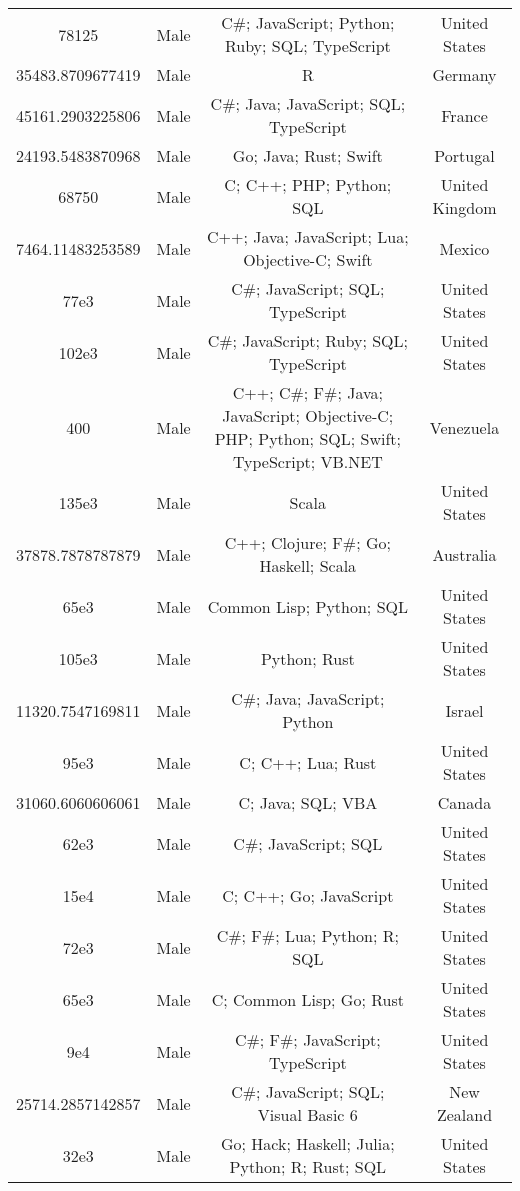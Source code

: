 \begin{center}
\begin{tabular}{ |c|c|c|c| }
78125  &  Male  &  C\#; JavaScript; Python; Ruby; SQL; TypeScript  &  United States  \\ 
35483.8709677419  &  Male  &  R  &  Germany  \\ 
45161.2903225806  &  Male  &  C\#; Java; JavaScript; SQL; TypeScript  &  France  \\ 
24193.5483870968  &  Male  &  Go; Java; Rust; Swift  &  Portugal  \\ 
68750  &  Male  &  C; C++; PHP; Python; SQL  &  United Kingdom  \\ 
7464.11483253589  &  Male  &  C++; Java; JavaScript; Lua; Objective-C; Swift  &  Mexico  \\ 
77e3  &  Male  &  C\#; JavaScript; SQL; TypeScript  &  United States  \\ 
102e3  &  Male  &  C\#; JavaScript; Ruby; SQL; TypeScript  &  United States  \\ 
400  &  Male  &  C++; C\#; F\#; Java; JavaScript; Objective-C; PHP; Python; SQL; Swift; TypeScript; VB.NET  &  Venezuela  \\ 
135e3  &  Male  &  Scala  &  United States  \\ 
37878.7878787879  &  Male  &  C++; Clojure; F\#; Go; Haskell; Scala  &  Australia  \\ 
65e3  &  Male  &  Common Lisp; Python; SQL  &  United States  \\ 
105e3  &  Male  &  Python; Rust  &  United States  \\ 
11320.7547169811  &  Male  &  C\#; Java; JavaScript; Python  &  Israel  \\ 
95e3  &  Male  &  C; C++; Lua; Rust  &  United States  \\ 
31060.6060606061  &  Male  &  C; Java; SQL; VBA  &  Canada  \\ 
62e3  &  Male  &  C\#; JavaScript; SQL  &  United States  \\ 
15e4  &  Male  &  C; C++; Go; JavaScript  &  United States  \\ 
72e3  &  Male  &  C\#; F\#; Lua; Python; R; SQL  &  United States  \\ 
65e3  &  Male  &  C; Common Lisp; Go; Rust  &  United States  \\ 
9e4  &  Male  &  C\#; F\#; JavaScript; TypeScript  &  United States  \\ 
25714.2857142857  &  Male  &  C\#; JavaScript; SQL; Visual Basic 6  &  New Zealand  \\ 
32e3  &  Male  &  Go; Hack; Haskell; Julia; Python; R; Rust; SQL  &  United States  \\ 

\end{tabular}
\end{center}
